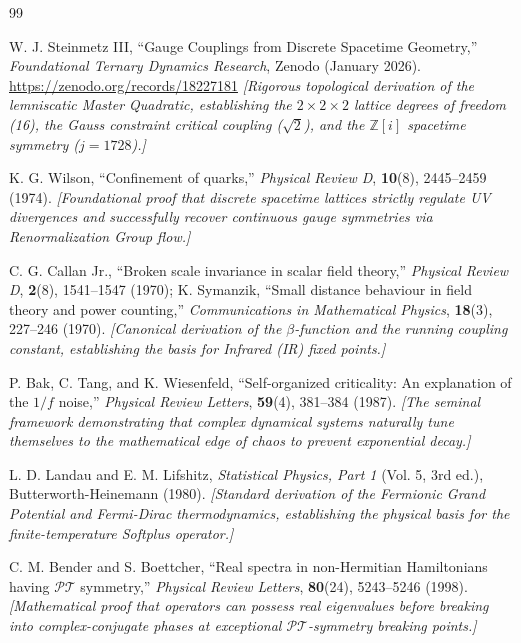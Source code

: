 \documentclass[11pt, letterpaper]{article}
\theoremstyle{definition}
\theoremstyle{remark}
\begin{document}
\begin{thebibliography}{99}

W. J. Steinmetz III,
``Gauge Couplings from Discrete Spacetime Geometry,''
\textit{Foundational Ternary Dynamics Research}, Zenodo (January 2026).
\url{https://zenodo.org/records/18227181}
\newblock \textit{[Rigorous topological derivation of the lemniscatic Master Quadratic, establishing the $2\times2\times2$ lattice degrees of freedom (16), the Gauss constraint critical coupling ($\sqrt{2}$), and the $\mathbb{Z}[i]$ spacetime symmetry ($j=1728$).]}

K. G. Wilson,
``Confinement of quarks,''
\textit{Physical Review D}, \textbf{10}(8), 2445--2459 (1974).
\newblock \textit{[Foundational proof that discrete spacetime lattices strictly regulate UV divergences and successfully recover continuous gauge symmetries via Renormalization Group flow.]}

C. G. Callan Jr.,
``Broken scale invariance in scalar field theory,''
\textit{Physical Review D}, \textbf{2}(8), 1541--1547 (1970);
K. Symanzik,
``Small distance behaviour in field theory and power counting,''
\textit{Communications in Mathematical Physics}, \textbf{18}(3), 227--246 (1970).
\newblock \textit{[Canonical derivation of the $\beta$-function and the running coupling constant, establishing the basis for Infrared (IR) fixed points.]}

P. Bak, C. Tang, and K. Wiesenfeld,
``Self-organized criticality: An explanation of the $1/f$ noise,''
\textit{Physical Review Letters}, \textbf{59}(4), 381--384 (1987).
\newblock \textit{[The seminal framework demonstrating that complex dynamical systems naturally tune themselves to the mathematical edge of chaos to prevent exponential decay.]}

L. D. Landau and E. M. Lifshitz,
\textit{Statistical Physics, Part 1} (Vol. 5, 3rd ed.), Butterworth-Heinemann (1980).
\newblock \textit{[Standard derivation of the Fermionic Grand Potential and Fermi-Dirac thermodynamics, establishing the physical basis for the finite-temperature Softplus operator.]}

C. M. Bender and S. Boettcher,
``Real spectra in non-Hermitian Hamiltonians having $\mathcal{PT}$ symmetry,''
\textit{Physical Review Letters}, \textbf{80}(24), 5243--5246 (1998).
\newblock \textit{[Mathematical proof that operators can possess real eigenvalues before breaking into complex-conjugate phases at exceptional $\mathcal{PT}$-symmetry breaking points.]}


\end{thebibliography}
\end{document}
